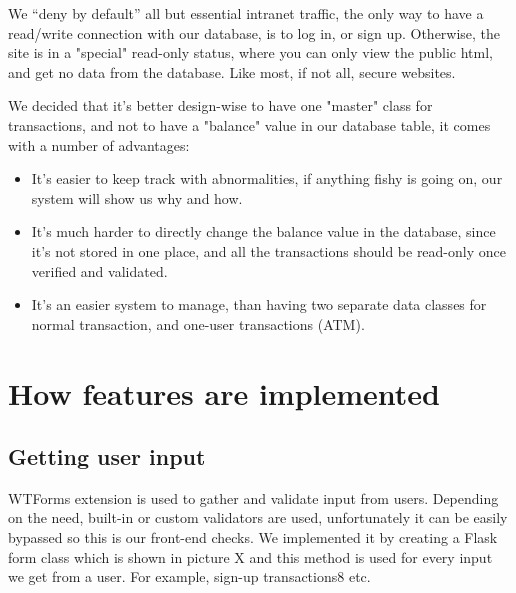 We “deny by default” all but essential intranet traffic, the only way to have a read/write connection with our database, is to log in, or sign up.
Otherwise, the site is in a "special" read-only status, where you can only view the public html, and get no data from the database. Like most, if not all, secure websites.

We decided that it's better design-wise to have one "master" class for transactions, and not to have a "balance" value in our database table, it comes with a number of advantages:
\begin{itemize}
    \item It's easier to keep track with abnormalities, if anything fishy is going on, our system will show us why and how.
    \item It's much harder to directly change the balance value in the database, since it's not stored in one place, and all the transactions should be read-only once verified and validated.
    \item It's an easier system to manage, than having two separate data classes for normal transaction, and one-user transactions (ATM).
\end{itemize}


\section{How features are implemented}

\subsection{Getting user input}

WTForms extension is used to gather and validate input from users. Depending on the need, built-in or custom validators are used, unfortunately it can be easily bypassed so this is our front-end checks. We implemented it by  creating a Flask form class which is shown in picture X and this method is used for every input we get from a user. For example, sign-up transactions8 etc. 

